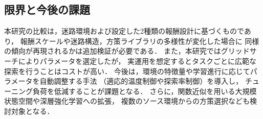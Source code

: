 \subsection{限界と今後の課題}
本研究の比較は，迷路環境および設定した2種類の報酬設計に基づくものであり，
報酬スケールや迷路構造，方策ライブラリの多様性が変化した場合に
同様の傾向が再現されるかは追加検証が必要である．
また，本研究ではグリッドサーチによりパラメータを選定したが，
実運用を想定するとタスクごとに広範な探索を行うことはコストが高い．
今後は，環境の特徴量や学習進行に応じてパラメータを自動調整する手法
（適応的温度制御や探索率制御）を導入し，
チューニング負荷を低減することが課題となる．
さらに，関数近似を用いる大規模状態空間や深層強化学習への拡張，
複数のソース環境からの方策選択なども検討対象となる．
